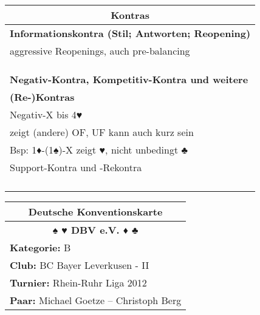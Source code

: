 \documentclass{article}
\begin{document}
\begin{multicols}{3}
\begin{tabularx}{\columnwidth}{|X|}
\multicolumn{1}{c}{\bf \large Kontras} \\
\hline {\bf Informationskontra (Stil; Antworten; Reopening)} \\
       {aggressive Reopenings, auch pre-balancing} \\
       {} \\
       {} \\
       {} \\
\hline {\bf Negativ-Kontra, Kompetitiv-Kontra und weitere} \\
       {\bf (Re-)Kontras} \\
       {Negativ-X bis 4♥} \\
       {zeigt (andere) OF, UF kann auch kurz sein} \\
       {Bsp: 1♦-(1♠)-X zeigt ♥, nicht unbedingt ♣} \\
       {Support-Kontra und -Rekontra} \\
       {} \\
       {} \\
       {} \\
       {} \\
\hline \end{tabularx}

\begin{tabularx}{\columnwidth}{|X|}
\hline \multicolumn{1}{c}{\bf \Large Deutsche Konventionskarte} \\
\hline \multicolumn{1}{c}{\bf \Large ♠ ♥ DBV e.V. ♦ ♣} \\
\hline {\bf Kategorie:} B \\
\hline {\bf Club:} BC Bayer Leverkusen - II \\
\hline {\bf Turnier:} Rhein-Ruhr Liga 2012 \\
\hline {\bf Paar:} Michael Goetze -- Christoph Berg \\


\end{tabularx}
\end{multicols}
\end{document}
